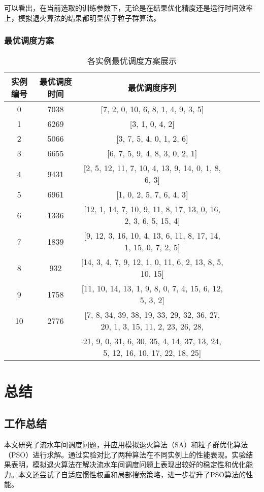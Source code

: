 \documentclass[12pt]{article}
\begin{document}
	可以看出，在当前选取的训练参数下，无论是在结果优化精度还是运行时间效率上，模拟退火算法的结果都明显优于粒子群算法。
	
	\subsubsection{最优调度方案}
	\begin{table}[H]
		\centering
		\caption{各实例最优调度方案展示}
		\begin{tabular}{ccccccc}
			\toprule %
			实例编号&最优调度时间&最优调度序列 \\ %
			\midrule %
			0&7038&[7, 2, 0, 10, 6, 8, 1, 4, 9, 3, 5]\\
			1&6269&[3, 1, 0, 4, 2]\\
			2&5066&[3, 7, 5, 4, 0, 1, 2, 6]\\
			3&6655&[6, 7, 5, 9, 4, 8, 3, 0, 2, 1]\\
			4&9431&[2, 5, 12, 11, 7, 10, 4, 13, 9, 14, 0, 1, 8, 6, 3]\\
			5&6961&[1, 0, 2, 5, 7, 6, 4, 3]\\
			6&1336&[12, 1, 14, 7, 10, 9, 11, 8, 17, 13, 0, 16, 2, 3, 6, 5, 15, 4]\\
			7&1839&[9, 12, 3, 16, 10, 4, 13, 6, 11, 8, 17, 14, 1, 15, 0, 7, 2, 5]\\
			8&932&[14, 3, 4, 7, 9, 12, 1, 0, 11, 6, 2, 13, 8, 5, 10, 15]\\
			9&1758&[11, 10, 14, 13, 1, 9, 8, 0, 7, 4, 15, 6, 12, 5, 3, 2]\\
			10&2776&[7, 8, 34, 39, 38, 19, 33, 29, 32, 36, 27, 20, 1, 3, 15, 11, 2, 23, 26, 28, \\
			&&21, 9, 0, 31, 6, 30, 35, 4, 14, 37, 13, 24, 5, 12, 16, 10, 17, 22, 18, 25]\\
			\bottomrule %
		\end{tabular}
	\end{table}
	
	\section{总结}
	\subsection{工作总结}
	本文研究了流水车间调度问题，并应用模拟退火算法（SA）和粒子群优化算法（PSO）进行求解。通过实验对比了两种算法在不同实例上的性能表现。实验结果表明，模拟退火算法在解决流水车间调度问题上表现出较好的稳定性和优化能力。本文还尝试了自适应惯性权重和局部搜索策略，进一步提升了PSO算法的性能。
	
\end{document}
